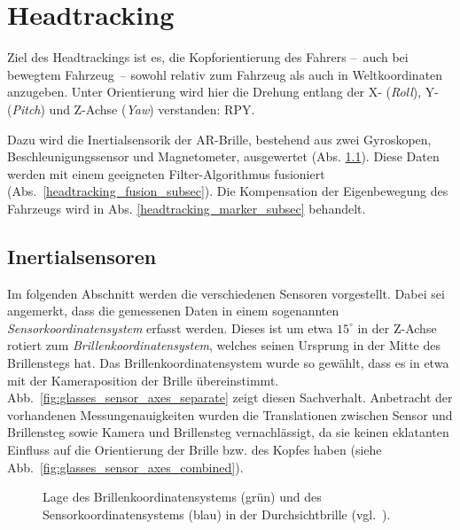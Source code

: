 
\section{Headtracking}

Ziel des Headtrackings ist es, die Kopforientierung des Fahrers --~auch bei bewegtem Fahrzeug~--
sowohl relativ zum Fahrzeug als auch in Weltkoordinaten anzugeben. Unter Orientierung wird hier die Drehung entlang der X- (\emph{Roll}), Y- (\emph{Pitch}) und Z-Achse (\emph{Yaw}) verstanden:
\acs{RPY}.

Dazu wird die Inertialsensorik der \ac{AR}-Brille, bestehend aus zwei Gyroskopen, Beschleunigungssensor und Magnetometer, ausgewertet (Abs. \ref{headtracking_imu_subsec}).
Diese Daten werden mit einem geeigneten Filter-Algorithmus fusioniert (Abs.~\ref{headtracking_fusion_subsec}).
Die Kompensation der Eigenbewegung des Fahrzeugs wird in Abs. \ref{headtracking_marker_subsec} behandelt.

\subsection{Inertialsensoren}
\label{headtracking_imu_subsec}
Im folgenden Abschnitt werden die verschiedenen Sensoren vorgestellt.
Dabei sei angemerkt, dass die gemessenen Daten in einem sogenannten \textit{Sensorkoordinatensystem} erfasst werden.
Dieses ist um etwa $15^\circ$ in der Z-Achse rotiert zum \textit{Brillenkoordinatensystem}, welches seinen Ursprung in der Mitte des Brillenstegs hat. 
Das Brillenkoordinatensystem wurde so gewählt, dass es in etwa mit der Kameraposition der Brille übereinstimmt.
Abb.~\ref{fig:glasses_sensor_axes_separate} zeigt diesen Sachverhalt.
Anbetracht der vorhandenen Messungenauigkeiten wurden die Translationen zwischen Sensor und Brillensteg sowie Kamera und Brillensteg vernachlässigt, da sie keinen eklatanten Einfluss auf die Orientierung der Brille bzw. des Kopfes haben (siehe Abb.~\ref{fig:glasses_sensor_axes_combined}).

\begin{figure}
  \caption{Lage des Brillenkoordinatensystems (grün) und des Sensorkoordinatensystems (blau) in der Durchsichtbrille (vgl.~\cite{vuzix_user_guide}).}
  \label{fig:glasses_sensor_axes}
\end{figure}

